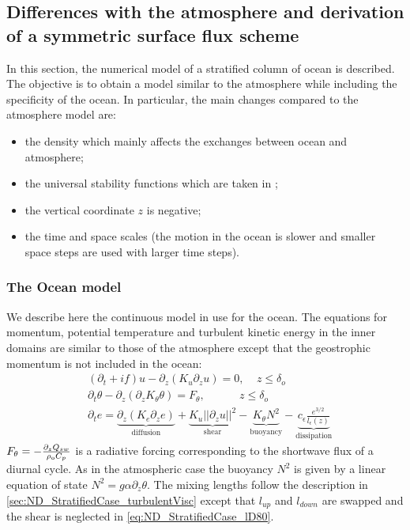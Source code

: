\subsection{Differences with the atmosphere and derivation of
	a symmetric surface flux scheme}
\label{sec:ND_Ocean_differencesWithAtmosphere}
In this section, the numerical model of a stratified column
of ocean is described. The objective is to obtain a model
similar to the atmosphere while including the specificity
of the ocean.
In particular, the main changes compared to the atmosphere
model are:
\begin{itemize}
	\item the density which mainly affects the exchanges
		between ocean and atmosphere;
	\item the universal stability functions which are
		taken in \cite{large_similarity_2019};
	\item the vertical coordinate $z$ is negative;
	\item the time and space scales (the motion in the ocean
		is slower and smaller space steps are used with
		larger time steps).
\end{itemize}
\subsubsection{The Ocean model}
We describe here the continuous model in use for the ocean.
The equations for momentum, potential temperature and
turbulent kinetic energy in the inner domains are similar
to those of the atmosphere
except that the geostrophic momentum is not included in the ocean:
\begin{equation}
	\begin{aligned}
	&(\partial_t + if) u - \partial_z (K_u \partial_z u) = 0
		,~~~~~ z \leq \delta_{o} \\
	&\partial_t \theta -\partial_z (\partial_z K_{\theta} \theta)
	= F_{\theta},~~~~~~~~~~~~~~ z \leq \delta_{o} \\
		&\partial_t e =
    \underbrace{\partial_z \left(K_e
    \partial_z e\right)}_{\text{diffusion}}
    + \underbrace{K_u ||\partial_z u||^2}_{\text{shear}} 
    - \underbrace{K_{\theta} N^2 }_{\text{buoyancy}}
    - \underbrace{c_{\epsilon}
    \frac{e^{3/2}}{l_{\epsilon}(z)}}_{\text{dissipation}}
	\end{aligned}
\end{equation}
$F_\theta = -\frac{\partial_z Q_{sw}}{\rho_{\rm o} C_p}$ is a
radiative forcing corresponding to the shortwave flux of a
diurnal cycle. As in the atmospheric case the buoyancy $N^2$ is
given by a linear equation of state
$N^2 = g \alpha \partial_z \theta$.
The mixing lengths follow the description in 
\ref{sec:ND_StratifiedCase_turbulentVisc}
except that $l_{up}$ and $l_{down}$ are swapped and the shear
is neglected in \eqref{eq:ND_StratifiedCase_lD80}.
%

